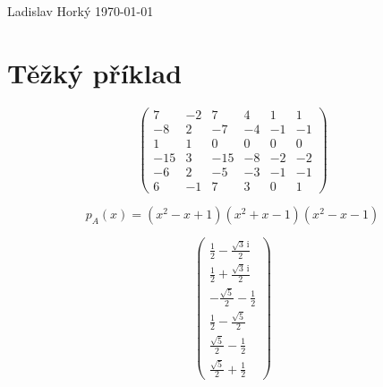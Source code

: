\documentclass[12pt, a4paper]{report}
\begin{document}
Ladislav Horký \hfill \today
\section{Těžký příklad}
\[
\begin{pmatrix} 
7 & -2 & 7 & 4 & 1 & 1\\ 
-8 & 2 & -7 & -4 & -1 & -1\\ 
1 & 1 & 0 & 0 & 0 & 0\\ 
-15 & 3 & -15 & -8 & -2 & -2\\ 
-6 & 2 & -5 & -3 & -1 & -1\\ 
6 & -1 & 7 & 3 & 0 & 1
\end{pmatrix}
\]

\[
p_A(x) = (x^2-x+1)(x^2+x-1)(x^2-x-1)
\]

\[
\left(\begin{array}{c} \frac{1}{2} - \frac{\sqrt{3}\, \mathrm{i}}{2}\\ \frac{1}{2} + \frac{\sqrt{3}\, \mathrm{i}}{2}\\  - \frac{\sqrt{5}}{2} - \frac{1}{2}\\ \frac{1}{2} - \frac{\sqrt{5}}{2}\\ \frac{\sqrt{5}}{2} - \frac{1}{2}\\ \frac{\sqrt{5}}{2} + \frac{1}{2} \end{array}\right)
\]
\end{document}
